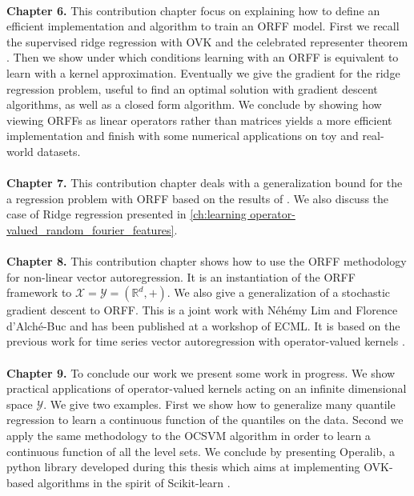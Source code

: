 \paragraph{}
\textbf{Chapter 6.}
This contribution chapter focus on explaining how to define an efficient
implementation and algorithm to train an \acs{ORFF} model. First we recall
the supervised ridge regression with \acs{OVK} and the celebrated representer
theorem \citep{Wahba90}. Then we show under which conditions learning with an
\acs{ORFF} is equivalent to learn with a kernel approximation. Eventually
we give the gradient for the ridge regression problem, useful to find an
optimal solution with gradient descent algorithms, as well as a closed form
algorithm.  We conclude by showing how viewing \acsp{ORFF} as linear operators
rather than matrices yields a more efficient implementation and finish with
some numerical applications on toy and real-world datasets.

\paragraph{}
\textbf{Chapter 7.}
This contribution chapter deals with a generalization bound for the a
regression problem with ORFF based on the results of \citet{rahimi2009weighted,
maurer2016vector}.  We also discuss the case of Ridge regression presented in
\cref{ch:learning operator-valued_random_fourier_features}.

\paragraph{}
\textbf{Chapter 8.}
This contribution chapter shows how to use the \acs{ORFF} methodology for
non-linear vector autoregression. It is an instantiation of the \acs{ORFF}
framework to $\mathcal{X}=\mathcal{Y}=\left(\mathbb{R}^d, +\right)$. We also
give a generalization of a stochastic gradient descent \citep{dai2014scalable}
to \acs{ORFF}. This is a joint work with N\'eh\'emy Lim and Florence
d'Alch\'e-Buc and has been published at a workshop of \acs{ECML}. It is based
on the previous work \citet{Lim2015} for time series vector autoregression with
operator-valued kernels \cite{brault2016scaling}.

\paragraph{}
\textbf{Chapter 9.}
To conclude our work we present some work in progress. We show practical
applications of operator-valued kernels acting on an infinite dimensional space
$\mathcal{Y}$. We give two examples. First we show how to generalize many
quantile regression to learn a continuous function of the quantiles on the
data. Second we apply the same methodology to the \acf{OCSVM} algorithm in
order to learn a continuous function of all the level sets. We conclude by
presenting Operalib, a python library developed during this thesis which aims
at implementing \acs{OVK}-based algorithms in the spirit of Scikit-learn
\citep{pedregosa2011scikit}.


